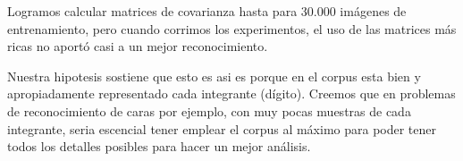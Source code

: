 Logramos calcular matrices de covarianza hasta para 30.000 im\'agenes de entrenamiento, pero cuando
corrimos los experimentos, el uso de las matrices m\'as ricas no aport\'o casi a un mejor reconocimiento.

Nuestra hipotesis sostiene que esto es asi es porque en el corpus esta bien y apropiadamente 
representado cada integrante (d\'igito). Creemos que en problemas de reconocimiento de caras por ejemplo, con
muy pocas muestras de cada integrante, seria escencial tener emplear el corpus al m\'aximo para poder
tener todos los detalles posibles para hacer un mejor an\'alisis.


